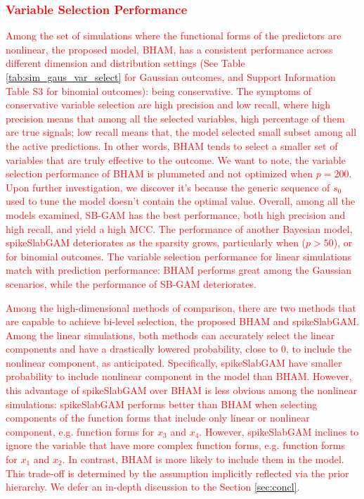 \documentclass[AMA,STIX1COL,]{WileyNJD-v2}
\begin{document}
\textcolor{red}{\subsubsection{Variable Selection Performance}}
\textcolor{red}{Among the set of simulations where the functional forms of the predictors are nonlinear, the proposed model, BHAM, has a consistent performance across different dimension and distribution settings (See Table \ref{tab:sim_gaus_var_select} for Gaussian outcomes, and Support Information Table S3 for binomial outcomes): being conservative. The symptoms of conservative variable selection are high precision and low recall, where high precision means that among all the selected variables, high percentage of them are true signals; low recall means that, the model selected small subset among all the active predictions. In other words, BHAM tends to select a smaller set of variables that are truly effective to the outcome. We want to note, the variable selection performance of BHAM is plummeted and not optimized when $p=200$. Upon further investigation, we discover it's because the generic sequence of $s_0$ used to tune the model doesn't contain the optimal value. Overall, among all the models examined, SB-GAM has the best performance, both high precision and high recall, and yield a high MCC. The performance of another Bayesian model, spikeSlabGAM deteriorates as the sparsity grows, particularly when ($p>50$), or for binomial outcomes. The variable selection performance for linear simulations match with prediction performance: BHAM performs great among the Gaussian scenarios, while the performance of SB-GAM deteriorates.}

\textcolor{red}{Among the high-dimensional methods of comparison, there are two methods that are capable to achieve bi-level selection, the proposed BHAM and spikeSlabGAM. Among the linear simulations, both methods can accurately select the linear components and have a drastically lowered probability, close to 0, to include the nonlinear component, as anticipated. Specifically, spikeSlabGAM have smaller probability to include nonlinear component in the model than BHAM. However, this advantage of spikeSlabGAM over BHAM is less obvious among the nonlinear simulations: spikeSlabGAM performs better than BHAM when selecting components of the function forms that include only linear or nonlinear component, e.g. function forms for $x_3$ and $x_4$. However, spikeSlabGAM inclines to ignore the variable that have more complex function forms, e.g. function forms for $x_1$ and $x_2$. In contrast, BHAM is more likely to include them in the model. This trade-off is determined by the assumption implicitly reflected via the prior hierarchy. We defer an in-depth discussion to the Section \ref{sec:concl}.}
\end{document}
